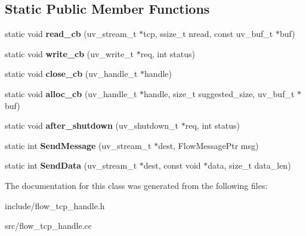 \subsection*{Static Public Member Functions}
\begin{DoxyCompactItemize}
\item 
static void {\bfseries read\+\_\+cb} (uv\+\_\+stream\+\_\+t $\ast$tcp, ssize\+\_\+t nread, const uv\+\_\+buf\+\_\+t $\ast$buf)\hypertarget{classflow_1_1_tcp_handle_a43afbe534f62ae875f3b6e5cb68a10b3}{}\label{classflow_1_1_tcp_handle_a43afbe534f62ae875f3b6e5cb68a10b3}

\item 
static void {\bfseries write\+\_\+cb} (uv\+\_\+write\+\_\+t $\ast$req, int status)\hypertarget{classflow_1_1_tcp_handle_a4203c561a5db3d2f777c68bdbcf7eeee}{}\label{classflow_1_1_tcp_handle_a4203c561a5db3d2f777c68bdbcf7eeee}

\item 
static void {\bfseries close\+\_\+cb} (uv\+\_\+handle\+\_\+t $\ast$handle)\hypertarget{classflow_1_1_tcp_handle_aeb5ca757f880827ad8e6c217694dd128}{}\label{classflow_1_1_tcp_handle_aeb5ca757f880827ad8e6c217694dd128}

\item 
static void {\bfseries alloc\+\_\+cb} (uv\+\_\+handle\+\_\+t $\ast$handle, size\+\_\+t suggested\+\_\+size, uv\+\_\+buf\+\_\+t $\ast$buf)\hypertarget{classflow_1_1_tcp_handle_ac8e62ea5770076bab1897c51e2537f09}{}\label{classflow_1_1_tcp_handle_ac8e62ea5770076bab1897c51e2537f09}

\item 
static void {\bfseries after\+\_\+shutdown} (uv\+\_\+shutdown\+\_\+t $\ast$req, int status)\hypertarget{classflow_1_1_tcp_handle_a92929da25e442de08a290ba0b1aefbb7}{}\label{classflow_1_1_tcp_handle_a92929da25e442de08a290ba0b1aefbb7}

\item 
static int {\bfseries Send\+Message} (uv\+\_\+stream\+\_\+t $\ast$dest, Flow\+Message\+Ptr msg)\hypertarget{classflow_1_1_tcp_handle_af96150eb63f535530c2b77f8314a89e3}{}\label{classflow_1_1_tcp_handle_af96150eb63f535530c2b77f8314a89e3}

\item 
static int {\bfseries Send\+Data} (uv\+\_\+stream\+\_\+t $\ast$dest, const void $\ast$data, size\+\_\+t data\+\_\+len)\hypertarget{classflow_1_1_tcp_handle_ad0fb6b3a0c7570fb23e8de98d12c005a}{}\label{classflow_1_1_tcp_handle_ad0fb6b3a0c7570fb23e8de98d12c005a}

\end{DoxyCompactItemize}


The documentation for this class was generated from the following files\+:\begin{DoxyCompactItemize}
\item 
include/flow\+\_\+tcp\+\_\+handle.\+h\item 
src/flow\+\_\+tcp\+\_\+handle.\+cc\end{DoxyCompactItemize}
